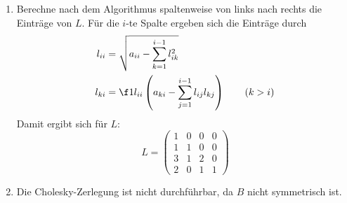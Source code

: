\documentclass{scrartcl}
\begin{document}
	\begin{aufgabe}
		\begin{enumerate}[A:]
			\item
				Berechne nach dem Algorithmus spaltenweise von links nach rechts die Einträge von $L$.
				Für die $i$-te Spalte ergeben sich die Einträge durch
				\begin{align*}
					l_{ii} &= \sqrt{a_{ii} - \sum_{k=1}^{i-1}l_{ik}^2}\\
					l_{ki} &= \f 1{l_{ii}} \left( a_{ki} - \sum_{j=1}^{i-1}l_{ij}l_{kj}\right) \qquad (k>i)
				\end{align*}
				Damit ergibt sich für $L$:
				\[
					L = \begin{pmatrix}1&0&0&0\\1&1&0&0\\3&1&2&0\\2&0&1&1\end{pmatrix}
				\]
			\item
				Die Cholesky-Zerlegung ist nicht durchführbar, da $B$ nicht symmetrisch ist.
		\end{enumerate}
	\end{aufgabe}
\end{document}
